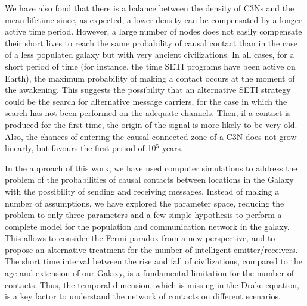 \documentclass[crop]{CSLB}
\newcommand{\ceti}{C3N}
\newcommand{\cetis}{C3Ns}
\begin{document}
We have also fond that there 
is a balance between the density of \cetis{} and the mean
lifetime since, as expected, a lower density can be compensated by a
longer active time period.
%
However, a large number of nodes does not easily compensate their
short lives to reach the same probability of causal contact than in
the case of a less populated galaxy but with very ancient
civilizations.
%
In all cases, for a short period of time (for instance, the time SETI
programs have been active on Earth), the maximum probability of making
a contact occurs at the moment of the awakening.
%
This suggests the possibility that an alternative SETI strategy could
be the search for alternative message carriers, for the case in which
the search has not been performed on the adequate channels.
%
Then, if a contact is produced for the first time, the origin of the
signal is more likely to be very old.
%
Also, the chances of entering the causal connected zone of a \ceti{}
does not grow linearly, but favours the first period of 10$^5$ years.


In the approach of this work, we have used computer simulations to address
the problem of the probabilities of causal contacts between locations
in the Galaxy with the possibility of sending and receiving messages.
%
Instead of making a number of assumptions, we have explored the
parameter space, reducing the problem to only three parameters and a
few simple hypothesis to perform a complete model for the population and
communication network in the galaxy.
%
This allows to consider the Fermi paradox from a new perspective, and
to propose an alternative treatment for the number of intelligent
emitter/receivers.
%
The short time interval between the
rise and fall of civilizations, compared to the age and extension of
our Galaxy, is a fundamental limitation for the number of contacts.
%
Thus, the temporal dimension, which is missing in the Drake
equation, is a key factor to understand the network of contacts on
different scenarios.


\end{document}
